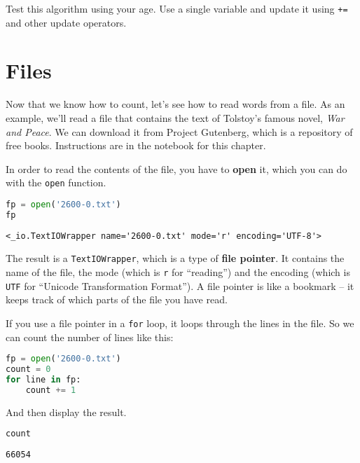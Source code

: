 Test this algorithm using your age. Use a single variable and update it
using \passthrough{\lstinline!+=!} and other update operators.

\section{Files}\label{files}

Now that we know how to count, let's see how to read words from a file.
As an example, we'll read a file that contains the text of Tolstoy's
famous novel, \emph{War and Peace}. We can download it from Project
Gutenberg, which is a repository of free books. Instructions are in the
notebook for this chapter.

In order to read the contents of the file, you have to \textbf{open} it,
which you can do with the \passthrough{\lstinline!open!} function.

\begin{lstlisting}[language=Python,style=source]
fp = open('2600-0.txt')
fp
\end{lstlisting}

\begin{lstlisting}[style=output]
<_io.TextIOWrapper name='2600-0.txt' mode='r' encoding='UTF-8'>
\end{lstlisting}

The result is a \passthrough{\lstinline!TextIOWrapper!}, which is a type
of \textbf{file pointer}. It contains the name of the file, the mode
(which is \passthrough{\lstinline!r!} for ``reading'') and the encoding
(which is \passthrough{\lstinline!UTF!} for ``Unicode Transformation
Format''). A file pointer is like a bookmark -- it keeps track of which
parts of the file you have read.

If you use a file pointer in a \passthrough{\lstinline!for!} loop, it
loops through the lines in the file. So we can count the number of lines
like this:

\begin{lstlisting}[language=Python,style=source]
fp = open('2600-0.txt')
count = 0
for line in fp:
    count += 1
\end{lstlisting}

And then display the result.

\begin{lstlisting}[language=Python,style=source]
count
\end{lstlisting}

\begin{lstlisting}[style=output]
66054
\end{lstlisting}

